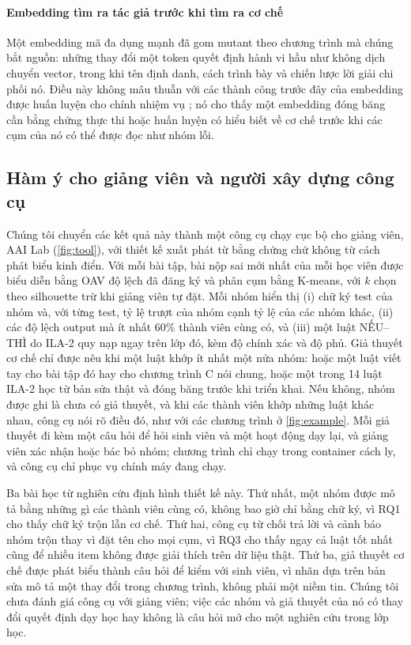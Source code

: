 \documentclass[a4paper,preprint,12pt,authoryear]{elsarticle}
\begin{document}
\paragraph{Embedding tìm ra tác giả trước khi tìm ra cơ chế}
Một embedding mã đa dụng mạnh đã gom mutant theo chương trình mà chúng bắt nguồn: những thay đổi một token quyết định hành vi hầu như không dịch chuyển vector, trong khi tên định danh, cách trình bày và chiến lược lời giải chi phối nó. Điều này không mâu thuẫn với các thành công trước đây của embedding được huấn luyện cho chính nhiệm vụ \citep{shi2021misconception,piech2015embeddings}; nó cho thấy một embedding đóng băng cần bằng chứng thực thi hoặc huấn luyện có hiểu biết về cơ chế trước khi các cụm của nó có thể được đọc như nhóm lỗi.

\subsection{Hàm ý cho giảng viên và người xây dựng công cụ}\label{sec:tool}
Chúng tôi chuyển các kết quả này thành một công cụ chạy cục bộ cho giảng viên, AAI Lab (\cref{fig:tool}), với thiết kế xuất phát từ bằng chứng chứ không từ cách phát biểu kinh điển. Với mỗi bài tập, bài nộp sai mới nhất của mỗi học viên được biểu diễn bằng OAV độ lệch đã đăng ký và phân cụm bằng K-means, với $k$ chọn theo silhouette trừ khi giảng viên tự đặt. Mỗi nhóm hiển thị (i) chữ ký test của nhóm và, với từng test, tỷ lệ trượt của nhóm cạnh tỷ lệ của các nhóm khác, (ii) các độ lệch output mà ít nhất 60\% thành viên cùng có, và (iii) một luật NẾU--THÌ do ILA-2 quy nạp ngay trên lớp đó, kèm độ chính xác và độ phủ. Giả thuyết cơ chế chỉ được nêu khi một luật khớp ít nhất một nửa nhóm: hoặc một luật viết tay cho bài tập đó hay cho chương trình C nói chung, hoặc một trong 14 luật ILA-2 học từ bản sửa thật và đóng băng trước khi triển khai. Nếu không, nhóm được ghi là chưa có giả thuyết, và khi các thành viên khớp những luật khác nhau, công cụ nói rõ điều đó, như với các chương trình ở \cref{fig:example}. Mỗi giả thuyết đi kèm một câu hỏi để hỏi sinh viên và một hoạt động dạy lại, và giảng viên xác nhận hoặc bác bỏ nhóm; chương trình chỉ chạy trong container cách ly, và công cụ chỉ phục vụ chính máy đang chạy.

Ba bài học từ nghiên cứu định hình thiết kế này. Thứ nhất, một nhóm được mô tả bằng những gì các thành viên cùng có, không bao giờ chỉ bằng chữ ký, vì RQ1 cho thấy chữ ký trộn lẫn cơ chế. Thứ hai, công cụ từ chối trả lời và cảnh báo nhóm trộn thay vì đặt tên cho mọi cụm, vì RQ3 cho thấy ngay cả luật tốt nhất cũng để nhiều item không được giải thích trên dữ liệu thật. Thứ ba, giả thuyết cơ chế được phát biểu thành câu hỏi để kiểm với sinh viên, vì nhãn dựa trên bản sửa mô tả một thay đổi trong chương trình, không phải một niềm tin. Chúng tôi chưa đánh giá công cụ với giảng viên; việc các nhóm và giả thuyết của nó có thay đổi quyết định dạy học hay không là câu hỏi mở cho một nghiên cứu trong lớp học.
\end{document}
